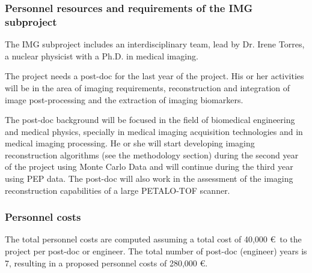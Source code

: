 \subsubsection*{Personnel resources and requirements of the IMG subproject}
 The IMG subproject includes an interdisciplinary team, lead by Dr. Irene Torres, a nuclear physicist with a Ph.D. in medical imaging. 
 
 The project needs a post-doc for the last year of the project. His or her activities will be in the area of imaging requirements, reconstruction and integration of image post-processing and the extraction of imaging biomarkers.
 
The post-doc background will be focused in the field of biomedical engineering and medical physics, specially in medical imaging acquisition technologies and in medical imaging processing. He or she will start developing imaging reconstruction algorithms (see the methodology section) during the second year of the project using Monte Carlo Data and will continue during the third year using PEP data. The post-doc will also work in the assessment of the imaging reconstruction capabilities of a large PETALO-TOF scanner. 
 

\subsubsection*{Personnel costs}
The total personnel costs are computed assuming a total cost of 40,000 \euro\ to the project per post-doc or engineer. The total number of post-doc (engineer) years is 7, resulting in a proposed personnel costs of 280,000 \euro. 

